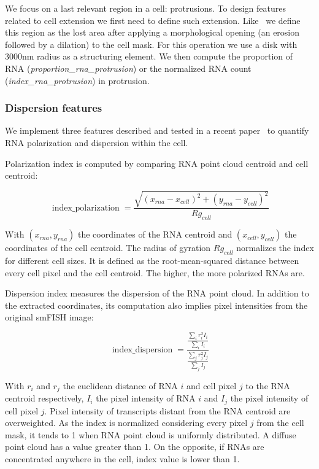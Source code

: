We focus on a last relevant region in a cell: protrusions.
To design features related to cell extension we first need to define such extension.
Like~\cite{samacoits_computational_2018} we define this region as the lost area after applying a morphological opening (an erosion followed by a dilation) to the cell mask.
For this operation we use a disk with 3000nm radius as a structuring element.
We then compute the proportion of \ac{RNA} (\emph{proportion\_rna\_protrusion}) or the normalized \ac{RNA} count (\emph{index\_rna\_protrusion}) in protrusion.

\subsubsection{Dispersion features}

We implement three features described and tested in a recent paper~\cite{stueland_rdi_2019} to quantify \ac{RNA} polarization and dispersion within the cell.

Polarization index is computed by comparing \ac{RNA} point cloud centroid and cell centroid:

\begin{equation}
	{\displaystyle \operatorname{index\_polarization} = \frac{\sqrt{(x_{rna} - x_{cell})^2 + (y_{rna} - y_{cell})^2}}{Rg_{cell}}}
\end{equation}

\noindent
With $(x_{rna}, y_{rna})$ the coordinates of the \ac{RNA} centroid and $(x_{cell}, y_{cell})$ the coordinates of the cell centroid.
The radius of gyration $Rg_{cell}$ normalizes the index for different cell sizes.
It is defined as the root-mean-squared distance between every cell pixel and the cell centroid.
The higher, the more polarized \ac{RNA}s are.

Dispersion index measures the dispersion of the \ac{RNA} point cloud.
In addition to the extracted coordinates, its computation also implies pixel intensities from the original \ac{smFISH} image:

\begin{equation}
	{\displaystyle \operatorname{index\_dispersion} = \frac{\frac{\sum_{i} r_i^2 I_i}{\sum_{i} I_i}}{\frac{\sum_{j} r_j^2 I_j}{\sum_{j} I_j}}}
\end{equation}

\noindent
With $r_i$ and $r_j$ the euclidean distance of \ac{RNA} $i$ and cell pixel $j$ to the \ac{RNA} centroid respectively, $I_i$ the pixel intensity of \ac{RNA} $i$ and $I_j$ the pixel intensity of cell pixel $j$.
Pixel intensity of transcripts distant from the \ac{RNA} centroid are overweighted.
As the index is normalized considering every pixel $j$ from the cell mask, it tends to 1 when \ac{RNA} point cloud is uniformly distributed.
A diffuse point cloud has a value greater than 1.
On the opposite, if \ac{RNA}s are concentrated anywhere in the cell, index value is lower than 1.

